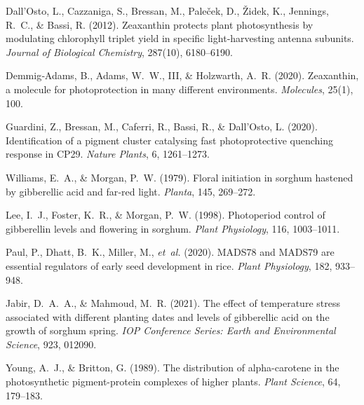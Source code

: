 \documentclass[10pt,letterpaper]{article}
\begin{document}
%
%
% 
\begin{thebibliography}{10}


Dall’Osto, L., Cazzaniga, S., Bressan, M., Paleček, D., Židek, K., Jennings, R.~C., \& Bassi, R. (2012).  
Zeaxanthin protects plant photosynthesis by modulating chlorophyll triplet yield in specific light‐harvesting antenna subunits.  
\emph{Journal of Biological Chemistry}, 287(10), 6180–6190.

Demmig‐Adams, B., Adams, W.~W., III, \& Holzwarth, A.~R. (2020).  
Zeaxanthin, a molecule for photoprotection in many different environments.  
\emph{Molecules}, 25(1), 100.

Guardini, Z., Bressan, M., Caferri, R., Bassi, R., \& Dall’Osto, L. (2020).  
Identification of a pigment cluster catalysing fast photoprotective quenching response in CP29.  
\emph{Nature Plants}, 6, 1261–1273.


Williams, E.~A., \& Morgan, P.~W. (1979).  
Floral initiation in sorghum hastened by gibberellic acid and far‐red light.  
\emph{Planta}, 145, 269–272.

Lee, I.~J., Foster, K.~R., \& Morgan, P.~W. (1998).  
Photoperiod control of gibberellin levels and flowering in sorghum.  
\emph{Plant Physiology}, 116, 1003–1011.

Paul, P., Dhatt, B.~K., Miller, M., \emph{et~al.} (2020).  
MADS78 and MADS79 are essential regulators of early seed development in rice.  
\emph{Plant Physiology}, 182, 933–948.

Jabir, D.~A.~A., \& Mahmoud, M.~R. (2021).  
The effect of temperature stress associated with different planting dates and levels of gibberellic acid on the growth of sorghum spring.  
\emph{IOP Conference Series: Earth and Environmental Science}, 923, 012090.

Young, A.~J., \& Britton, G. (1989).
\newblock The distribution of alpha-carotene in the photosynthetic pigment-protein complexes of higher plants.
\newblock \emph{Plant Science}, 64, 179–183.


\end{thebibliography}
\end{document}
